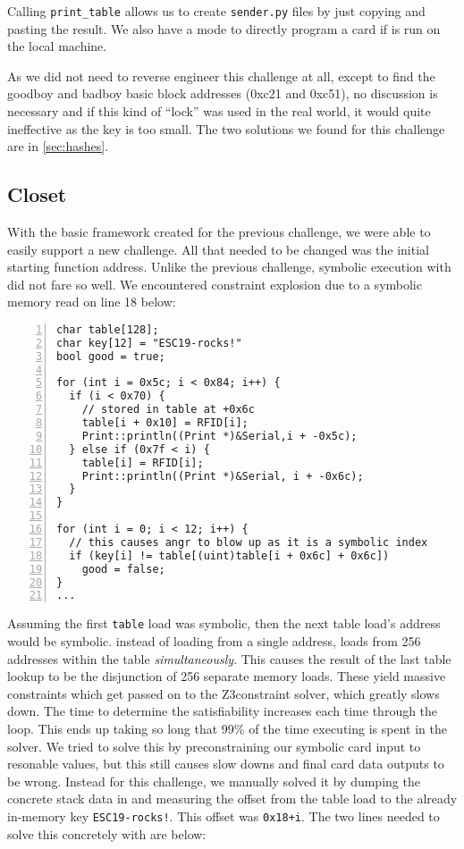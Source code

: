 Calling \texttt{print\_table} allows us to create \texttt{sender.py} files by just copying and pasting the result. We also have a mode to directly program a card if \angr is run on the local machine.

As we did not need to reverse engineer this challenge at all, except to find the goodboy and badboy basic block addresses (0xc21 and 0xc51), no discussion is necessary and if this kind of ``lock'' was used in the real world, it would quite ineffective as the key is too small.
The two solutions we found for this challenge are in \autoref{sec:hashes}.

\subsection{Closet}
With the basic \angr framework created for the previous challenge, we were able to easily support a new challenge. All that needed to be changed was the initial starting function address. Unlike the previous challenge, symbolic execution with \angr did not fare so well.
We encountered constraint explosion due to a symbolic memory read on line 18 below:

\begin{lstlisting}[numbers=left,xleftmargin=2em]
char table[128];
char key[12] = "ESC19-rocks!"
bool good = true;

for (int i = 0x5c; i < 0x84; i++) {
  if (i < 0x70) {
    // stored in table at +0x6c
    table[i + 0x10] = RFID[i];
    Print::println((Print *)&Serial,i + -0x5c);
  } else if (0x7f < i) {
    table[i] = RFID[i];
    Print::println((Print *)&Serial, i + -0x6c);
  }
}

for (int i = 0; i < 12; i++) {
  // this causes angr to blow up as it is a symbolic index
  if (key[i] != table[(uint)table[i + 0x6c] + 0x6c])
    good = false;
}
...
\end{lstlisting}

Assuming the first \texttt{table} load was symbolic, then the next table load's address would be symbolic. \angr instead of loading from a single address, loads from 256 addresses within the table \emph{simultaneously}. This causes the result of the last table lookup to be the disjunction of 256 separate memory loads. These yield massive constraints which get passed on to the Z3\needref constraint solver, which greatly slows down. The time to determine the satisfiability increases each time through the loop. This ends up taking so long that 99\% of the time executing is spent in the solver. We tried to solve this by preconstraining our symbolic card input to resonable values, but this still causes slow downs and final card data outputs to be wrong. Instead for this challenge, we manually solved it by dumping the concrete stack data in \angr and measuring the offset from the table load to the already in-memory key \texttt{ESC19-rocks!}. This offset was \texttt{0x18+i}. The two lines needed to solve this concretely with \angr are below:

